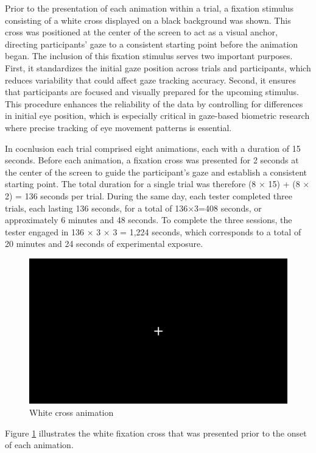 \documentclass{article}
\begin{document}
Prior to the presentation of each animation within a trial, a fixation stimulus consisting of a white cross displayed on a black background was shown.
This cross was positioned at the center of the screen to act as a visual anchor, directing participants' gaze to a consistent starting point before the animation began. 
The inclusion of this fixation stimulus serves two important purposes. 
First, it standardizes the initial gaze position across trials and participants, which reduces variability that could affect gaze tracking accuracy. 
Second, it ensures that participants are focused and visually prepared for the upcoming stimulus.
This procedure enhances the reliability of the data by controlling for differences in initial eye position, which is especially critical in gaze-based biometric research where precise tracking of eye movement patterns is essential.

In cocnlusion each trial comprised eight animations, each with a duration of 15 seconds. 
Before each animation, a fixation cross was presented for 2 seconds at the center of the screen to guide the participant's gaze and establish a consistent starting point. 
The total duration for a single trial was therefore (8 × 15) + (8 × 2) = 136 seconds per trial.
During the same day, each tester completed three trials, each lasting 136 seconds, for a total of 136×3=408 seconds, or approximately 6 minutes and 48 seconds. 
To complete the three sessions, the tester engaged in 136 × 3 × 3 = 1,224 seconds, which corresponds to a total of 20 minutes and 24 seconds of experimental exposure.

\begin{figure}[ht]
    \centering
    \includegraphics[width = 0.6
    \textwidth]{Images/Experiment/cross.png}
    \caption{White cross animation}
    \label{fig:cross}
\end{figure}

Figure \ref{fig:cross} illustrates the white fixation cross that was presented prior to the onset of each animation.
\end{document}
